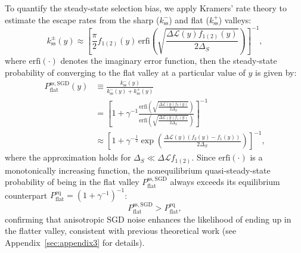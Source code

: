 \documentclass[aps,prx,reprint,superscriptaddress,longbibliography,nofootinbib,floatfix]{revtex4-2}
\begin{document}
To quantify the steady-state selection bias, we apply Kramers’ rate theory to estimate the escape rates from the sharp ($k_\mathrm{ss}^{-}$) and flat ($k_\mathrm{ss}^{+}$) valleys:
\begin{equation}
k_\mathrm{ss}^{\pm}(y)\approx \left[ \frac{\pi}{2}f_{1(2)}(y) \,\mathrm{erfi}\left(
\sqrt{\frac{\Delta \mathcal{L}(y)f_{1(2)}(y)}{2\Delta_S}}\right) \right]^{-1},
\end{equation}
where $\mathrm{erfi}(\cdot)$ denotes the imaginary error function, then the steady-state probability of converging to the flat valley at a particular value of $y$ is given by:
\begin{equation}
\begin{split}
    P_{\mathrm{flat}}^{\mathrm{ss,SGD}}(y)
    &\equiv\frac{k_\mathrm{ss}^{-}(y)}{k_\mathrm{ss}^{-}(y)+k_\mathrm{ss}^{+}(y)}   \\
    &= \left[1 + \gamma^{-1}\frac{\mathrm{erfi}\left(\sqrt{\frac{ \Delta \mathcal{L}(y)f_2(y)}{2\Delta_S}}\right)}
                     {\mathrm{erfi}\left(\sqrt{\frac{ \Delta \mathcal{L}(y)f_1(y)}{2\Delta_S}}\right)}\right]^{-1}  \\
    &\approx  \left[1 + \gamma^{-\frac{1}{2}}
    \exp\left(\frac{\Delta \mathcal{L}(y)(f_2(y)-f_1(y))}{2\Delta_S}\right)\right]^{-1},
\label{eq:ss_SGD}
\end{split}
\end{equation}
where the approximation holds for $\Delta_S \ll \Delta \mathcal{L} f_{1(2)}$. Since $\mathrm{erfi}(\cdot)$ is a monotonically increasing function, the nonequilibrium quasi-steady-state probability of being in the flat valley $P_{\mathrm{flat}}^{\mathrm{ss,SGD}}$ always exceeds its equilibrium counterpart $P_{\mathrm{flat}}^{\mathrm{eq}}= (1+\gamma^{-1})^{-1}$:
\begin{equation}
P_{\mathrm{flat}}^{\mathrm{ss,SGD}}>P_{\mathrm{flat}}^{\mathrm{eq}},
\label{eq:ss_eq}
\end{equation}
confirming that anisotropic SGD noise enhances the likelihood of ending up in the flatter valley, consistent with previous theoretical work \cite{xieDiffusionTheoryDeep2021} (see Appendix~\ref{sec:appendix3} for details).
\end{document}
